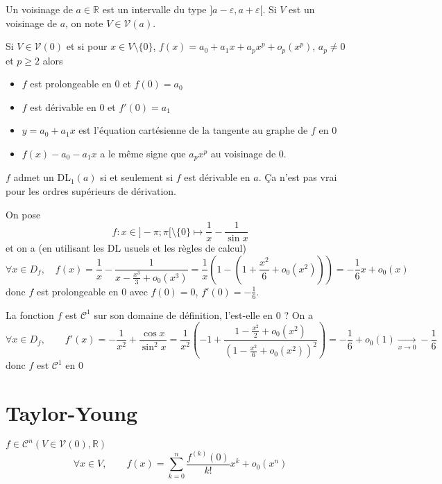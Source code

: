 \begin{dfn}
    Un voisinage de $a\in\mathbb R$ est un intervalle du type $]a-\varepsilon, a+\varepsilon[$. Si $V$ est un voisinage de $a$, on note $V\in\mathcal V(a)$.
\end{dfn}

Si $V\in\mathcal V(0)$ et si pour $x\in V\setminus\{0\}$, $f(x)=a_0+a_1x +a_px^p+o_p(x^p)$, $a_p\neq 0$ et $p\geq 2$ alors \begin{itemize}
    \item $f$ est prolongeable en $0$ et $f(0)=a_0$
    \item $f$ est dérivable en $0$ et $f'(0)=a_1$
    \item $y=a_0+a_1x$ est l'équation cartésienne de la tangente au graphe de $f$ en $0$
    \item $f(x)-a_0-a_1x$ a le même signe que $a_px^p$ au voisinage de $0$.
\end{itemize}

\begin{rem}
    $f$ admet un $\mathrm{DL}_1(a)$ si et seulement si $f$ est dérivable en $a$. Ça n'est pas vrai pour les ordres supérieurs de dérivation.
\end{rem}

\begin{ex}
    On pose \[
        f: x\in]-\pi;\pi[\setminus\{0\} \longmapsto \frac 1x-\frac1{\sin x}
    \]
    et on a (en utilisant les DL usuels et les règles de calcul) \[
        \forall x\in D_f,\quad f(x)=\frac1x-\frac1{x-\frac{x^3}3+o_0(x^3)}=\frac1x \left( 1- \left( 1+\frac {x^2}6+o_0(x^2) \right)\right)=-\frac16x+o_0(x)
    \]
    donc $f$ est prolongeable en $0$ avec $f(0)=0$, $f'(0)=-\frac 16$.

    La fonction $f$ est $\mathcal C^1$ sur son domaine de définition, l'est-elle en $0$ ? On a \[
        \forall x\in D_f, \qquad f'(x)=-\frac1{x^2}+\frac{\cos x}{\sin^2x}=\frac1{x^2} \left( -1+\frac{1-\frac{x^2}2+o_0(x^2)}{(1-\frac{x^2}6+o_0(x^2))^2} \right)=-\frac16+o_0(1)\xrightarrow[x\to 0]{}-\frac16
    \]
    donc $f$ est $\mathcal C^1$ en $0$
\end{ex}

\section{Taylor-Young}

\begin{thm}
    \Hyp $f\in\mathcal C^n(V\in\mathcal V(0), \mathbb R)$
    \Conc \[
            \forall x\in V, \qquad f(x)=\sum_{k=0}^n\frac{f^{(k)}(0)}{k!}x^k+o_0(x^n)
    \]
\end{thm}
